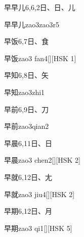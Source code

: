 \begin{entry}{早早儿}{6,6,2}{⽇、⽇、⼉}
  \begin{phonetics}{早早儿}{zao3zao3r5}
  \end{phonetics}
\end{entry}

\begin{entry}{早饭}{6,7}{⽇、⾷}
  \begin{phonetics}{早饭}{zao3 fan4}[][HSK 1]
  \end{phonetics}
\end{entry}

\begin{entry}{早知}{6,8}{⽇、⽮}
  \begin{phonetics}{早知}{zao3zhi1}
  \end{phonetics}
\end{entry}

\begin{entry}{早前}{6,9}{⽇、⼑}
  \begin{phonetics}{早前}{zao3qian2}
  \end{phonetics}
\end{entry}

\begin{entry}{早晨}{6,11}{⽇、⽇}
  \begin{phonetics}{早晨}{zao3 chen2}[][HSK 2]
  \end{phonetics}
\end{entry}

\begin{entry}{早就}{6,12}{⽇、⼪}
  \begin{phonetics}{早就}{zao3 jiu4}[][HSK 2]
  \end{phonetics}
\end{entry}

\begin{entry}{早期}{6,12}{⽇、⽉}
  \begin{phonetics}{早期}{zao3 qi1}[][HSK 5]
  \end{phonetics}
\end{entry}

